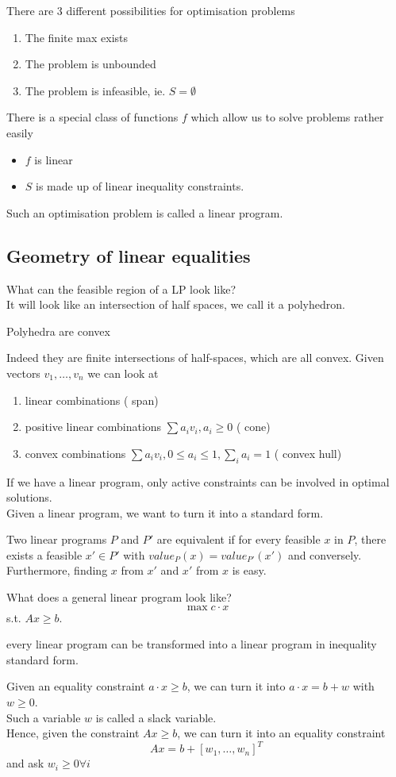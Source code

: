 \documentclass[../main.tex]{subfiles}
\begin{document}
There are 3 different possibilities for optimisation problems
\begin{enumerate}
\item The finite max exists
\item The problem is unbounded
\item The problem is infeasible, ie. $S = \emptyset$ 
\end{enumerate}
There is a special class of functions $f$ which allow us to solve problems rather easily
\begin{itemize}
\item $f$ is linear
\item $S$ is made up of linear inequality constraints.
\end{itemize}
Such an optimisation problem is called a linear program.
\subsection{Geometry of linear equalities}
What can the feasible region of a LP look like?\\
It will look like an intersection of half spaces, we call it a polyhedron.

\begin{propo}
Polyhedra are convex
\end{propo}
Indeed they are finite intersections of half-spaces, which are all convex.
Given vectors $v_1,\ldots, v_n$ we can look at
\begin{enumerate}
\item linear combinations ( span) 
\item positive linear combinations $\sum a_i v_i, a_i \geq 0$ ( cone) 
\item convex combinations $\sum a_i v_i, 0 \leq a_i \leq 1, \sum_i a_i =1$ ( convex hull) 
\end{enumerate}
If we have a linear program, only active constraints can be involved in optimal solutions.\\
Given a linear program, we want to turn it into a standard form.
\begin{defn}
	Two linear programs $P $ and $P'$  are equivalent if for every feasible $x$ in $P$, there exists a feasible $x' \in P'$ with $value_P( x) = value_{P'} ( x') $ and conversely.\\
	Furthermore, finding $x$ from $x'$ and $x'$ from $x$ is easy.
\end{defn}
What does a general linear program look like?
\[ 
\max c \cdot x
\]
s.t. $Ax \geq b$.
\begin{propo}
every linear program can be transformed into a linear program in inequality standard form.
\end{propo}
Given an equality constraint $a\cdot x \geq b$, we can turn it into $a \cdot x =b+w$ with $w \geq 0$.\\
Such a variable $w$ is called a slack variable.\\
Hence, given the constraint $Ax \geq b$, we can turn it into an equality constraint
\[ 
	Ax = b + \left[ w_1, \ldots, w_n \right]^{T}
\]
and ask $w_i \geq 0\forall i$ 
\end{document}
